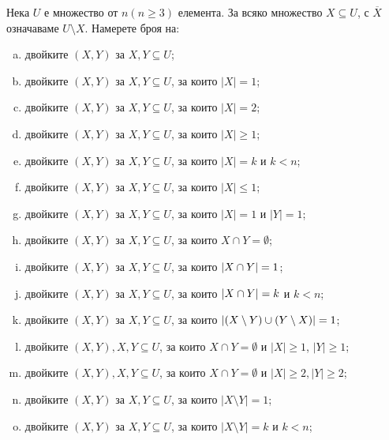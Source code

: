\begin{problem} %
  Нека $U$ е множество от $n (n\geq 3)$ елемента. За всяко множество $X\subseteq U$, с $\overline{X}$ означаваме $U\setminus X$.
  Намерете броя на:
  \begin{enumerate}[a)]
  \item
    двойките $(X,Y)$ за $X,Y\subseteq U$;
  \item
    двойките $(X,Y)$ за $X,Y\subseteq U$, за които $\vert{X}\vert = 1$;
  \item
    двойките $(X,Y)$ за $X,Y\subseteq U$, за които $\vert{X}\vert = 2$;
  \item
    двойките $(X,Y)$ за $X,Y\subseteq U$, за които $\vert{X}\vert \geq 1$;
  \item
    двойките $(X,Y)$ за $X,Y\subseteq U$, за които $\vert{X}\vert = k$ и $k < n$;
  \item
    двойките $(X,Y)$ за $X,Y\subseteq U$, за които $\vert{X}\vert \leq 1$;
  \item
    двойките $(X,Y)$ за $X,Y\subseteq U$, за които $\vert{X}\vert = 1$ и $\vert{Y}\vert = 1$;
  \item
    двойките $(X,Y)$ за $X,Y\subseteq U$, за които $X \cap Y = \emptyset$;
  \item
    двойките $(X,Y)$ за $X,Y\subseteq U$, за които $\lvert{X \cap Y}\rvert = 1$;
  \item
    двойките $(X,Y)$ за $X,Y\subseteq U$, за които $\lvert{X \cap Y}\rvert = k$ и $k < n$;
  \item
    двойките $(X,Y)$ за $X,Y\subseteq U$, за които $\lvert{(X\setminus Y) \cup (Y\setminus X)}\rvert = 1$;
  \item
    двойките $(X,Y), X,Y\subseteq U$, за които $X\cap Y = \emptyset$ и
    $|X|\geq 1$, $|Y|\geq 1$;
  \item
    двойките $(X,Y), X,Y\subseteq U$, за които $X\cap Y = \emptyset$ и 
    $|X|\geq 2, |Y|\geq 2$;
  \item
    двойките $(X,Y)$ за $X,Y\subseteq U$, за които $\vert{X\setminus Y}\vert = 1$;
  \item
    двойките $(X,Y)$ за $X,Y\subseteq U$, за които $\vert{X\setminus Y}\vert = k$ и $k < n$;

\end{enumerate}
\end{problem}

